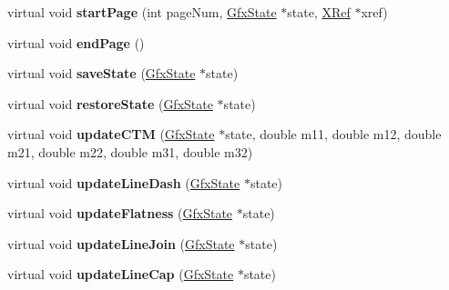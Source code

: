 \begin{DoxyCompactItemize}
\item 
\mbox{\label{class_p_s_output_dev_ad692995bea4c354b89cd26dbb325b3ba}} 
virtual void {\bfseries start\+Page} (int page\+Num, \hyperlink{class_gfx_state}{Gfx\+State} $\ast$state, \hyperlink{class_x_ref}{X\+Ref} $\ast$xref)
\item 
\mbox{\label{class_p_s_output_dev_a4027b6f745f0e3aaa5e0d69647fdd71d}} 
virtual void {\bfseries end\+Page} ()
\item 
\mbox{\label{class_p_s_output_dev_aaa004a191a39a4f72426fa22d6d79a2c}} 
virtual void {\bfseries save\+State} (\hyperlink{class_gfx_state}{Gfx\+State} $\ast$state)
\item 
\mbox{\label{class_p_s_output_dev_a457e929bc221c6e54bb0cf52a0839818}} 
virtual void {\bfseries restore\+State} (\hyperlink{class_gfx_state}{Gfx\+State} $\ast$state)
\item 
\mbox{\label{class_p_s_output_dev_aa8c62b85633f06a4de15da65cb80463c}} 
virtual void {\bfseries update\+C\+TM} (\hyperlink{class_gfx_state}{Gfx\+State} $\ast$state, double m11, double m12, double m21, double m22, double m31, double m32)
\item 
\mbox{\label{class_p_s_output_dev_aa0c84d4407b36505c7819c2ce9c6f8a5}} 
virtual void {\bfseries update\+Line\+Dash} (\hyperlink{class_gfx_state}{Gfx\+State} $\ast$state)
\item 
\mbox{\label{class_p_s_output_dev_a4caf82b39806c48d83fb24054df64e2f}} 
virtual void {\bfseries update\+Flatness} (\hyperlink{class_gfx_state}{Gfx\+State} $\ast$state)
\item 
\mbox{\label{class_p_s_output_dev_a0891c1ada1e938d8351e184dddf916d3}} 
virtual void {\bfseries update\+Line\+Join} (\hyperlink{class_gfx_state}{Gfx\+State} $\ast$state)
\item 
\mbox{\label{class_p_s_output_dev_a1d144ceae407c15dca0d0d87a637edab}} 
virtual void {\bfseries update\+Line\+Cap} (\hyperlink{class_gfx_state}{Gfx\+State} $\ast$state)

\end{DoxyCompactItemize}

